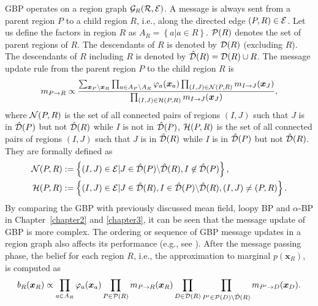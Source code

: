 GBP operates on a region graph $\mathcal{G}_R(\mathcal{R},\mathcal{E})$. A message is always sent from a parent region $P$ to a child region $R$, i.e., along the directed edge $(P, R)\in \mathcal{E}$. Let us define the factors in region $R$ as $A_R = \left\{ a | a \in R \right\}$. $\mathcal{P}(R)$ denotes the set of parent regions of $R$. The descendants of $R$ is denoted by $\mathcal{D}(R)$ (excluding $R$). The descendants of $R$ including $R$ is denoted by $\hat{\mathcal{D}}(R) = \mathcal{D}(R) \cup R$. The message update rule from the parent region $P$ to the child region $R$ is
\begin{align}\label{chpt4:eq-gbp-update-rule}
  m_{P\rightarrow R} \propto \frac{\sum_{\bm{x}_P\backslash
  \bm{x}_R}\prod_{a\in A_P\backslash A_R}\varphi_a(\bm{x}_a)\prod_{(I,J)
  \in \mathcal{N}(P, R)}m_{I\rightarrow J}(\bm{x}_J)}{\prod_{(I,J)
  \in \mathcal{H}(P, R)}m_{I\rightarrow J}(\bm{x}_J)},
\end{align}
where $\mathcal{N}(P, R)$ is the set of all connected pairs of regions $(I, J)$ such that $J$ is in $\hat{\mathcal{D}}(P)$ but not $\hat{\mathcal{D}}(R)$ while $I$ is not in $\hat{\mathcal{D}}(P)$, $\mathcal{H}(P, R)$ is the set of all connected pairs of regions $(I, J)$ such that $J$ is in $\hat{\mathcal{D}}(R)$ while $I$ is in $\hat{\mathcal{D}}(P)$ but not $\hat{\mathcal{D}}(R)$. They are formally defined as
\begin{align}\label{chpt4:eq:gbp-two-sets}
  \mathcal{N}(P, R) &:= \left\{ (I,J)\in \mathcal{E} | J \in \hat{\mathcal{D}}(P) \backslash \hat{\mathcal{D}}(R), I \not\in \hat{\mathcal{D}}(P)\right\},\nonumber \\
  \mathcal{H}(P, R) &:= \left\{ (I,J) \in \mathcal{E} | J \in \hat{\mathcal{D}}(R), I \in \hat{\mathcal{D}}(P) \backslash \hat{\mathcal{D}}(R), (I,J) \neq (P,R) \right\}.
\end{align}
By comparing the GBP with previously discussed mean field, loopy BP and $\alpha$-BP in Chapter~\ref{chapter2} and \ref{chapter3}, it can be seen that the message update of GBP is more complex. The ordering or sequence of GBP message updates in a region graph also affects its performance (e.g., see \cite{yedida2005constucting}). After the message passing phase, the belief for each region $R$, i.e., the approximation to marginal $p(\bm{x}_{R})$, is computed as
\begin{align}\label{chpt4:gbp-belief-rule}
  b_R(\bm{x}_R) \propto \prod_{a\in A_R} \varphi_a(\bm{x}_a) \prod_{P\in
  \mathcal{P}(R)} m_{P\rightarrow R}(\bm{x}_R) \prod_{D\in \mathcal{D}(R)} \prod_{P^{\prime} \in \mathcal{P}(D) \backslash \hat{\mathcal{D}}(R)} m_{P^{\prime}\rightarrow D}(\bm{x}_D).
\end{align}


